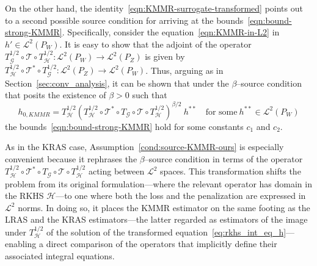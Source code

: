 \documentclass[twoside,11pt]{article}
\newcommand{\mc}{\mathcal}
\begin{document}
On the other hand, the identity~\eqref{eqn:KMMR-surrogate-transformed} points out to a second possible source condition for arriving at the bounds~\eqref{eqn:bound-strong-KMMR}. Specifically, consider the equation~\eqref{eqn:KMMR-in-L2} in $h' \in \mc{L}^2(P_W)$. 
It is easy to show that the adjoint of the operator $T_\mc{G}^{1/2} \circ \mc{T} \circ T_\mc{H}^{1/2}:\mc{L}^2(P_W) \rightarrow \mc{L}^2(P_Z) $ 
is given by $T_\mc{H}^{1/2} \circ \mc{T}^* \circ T_\mc{G}^{1/2}: \mc{L}^2(P_Z) \rightarrow \mc{L}^2(P_W)$. Thus, arguing as in Section~\ref{sec:conv_analysis}, it can be shown that under the $\beta$--source condition that posits the existence of $\beta>0$ such that
\begin{equation}
h_{0,KMMR}=T_{\mc{H}}^{1/2}(T_\mc{H}^{1/2}\circ\mc{T}^*\circ T_\mc{G} \circ \mc{T} \circ T_\mc{H}^{1/2})^{\beta/2}\:h^{**} \quad \text{for some} \: h^{**} \in \mc{L}^2(P_W)
\label{cond:source-KMMR-ours}
\end{equation}
the bounds~\eqref{eqn:bound-strong-KMMR} hold for some constants $c_1$ and $c_2$. 

As in the KRAS case, Assumption~\eqref{cond:source-KMMR-ours} is especially convenient because it rephrases the $\beta$–source condition in terms of the operator $T_\mc{H}^{1/2}\circ\mc{T}^*\circ T_\mc{G} \circ \mc{T} \circ T_\mc{H}^{1/2}$ acting between $\mathcal{L}^2$ spaces. This transformation shifts the problem from its original formulation---where the relevant operator has domain in the RKHS $\mathcal{H}$---to one where both the loss and the penalization are expressed in $\mathcal{L}^2$ norms. In doing so, it places the KMMR estimator on the same footing as the LRAS and the KRAS estimators---the latter regarded as estimators of the image under $T_\mc{H}^{1/2}$ of the solution of the transformed equation~\eqref{eq:rkhs_int_eq_h}---enabling a direct comparison of the operators that implicitly define their associated integral equations.
\end{document}
